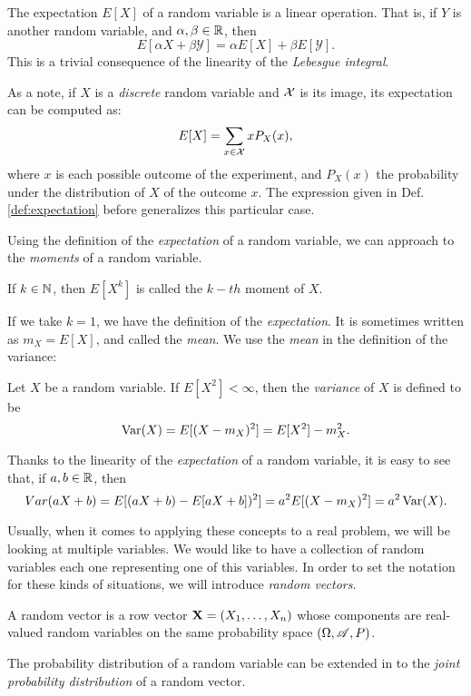 The expectation $E[X]$ of a random variable is a linear operation. That is, if $Y$ is another random variable, and $\alpha,\beta \in \mathbb{R}$, then
$$
E[\alpha X + \beta \mathcal Y] = \alpha E[X] + \beta E[\mathcal Y].
$$
This is a trivial consequence of the linearity of the \emph{Lebesgue integral}.

As a note, if $X$ is a \emph{discrete} random variable and $\mathcal{X}$ is its image, its expectation can be computed as:
$$
E[X] = \sum_{x \in \mathcal{X}} x  P_X(x),
$$
where $x$ is each possible outcome of the experiment, and $P_X(x)$ the probability under the distribution of $X$ of the outcome $x$. 
The expression given in Def. \cref{def:expectation} before generalizes this particular case.

Using the definition of the \emph{expectation} of a random variable, we can approach to the \emph{moments} of a random variable.

\begin{ndef}
If $k \in \mathbb N$, then $E[X^k]$ is called the $k-th$ moment of $X$.
\end{ndef}
If we take $k = 1$, we have the definition of the \emph{expectation}. It is sometimes written as $m_X = E[X]$, and called the \emph{mean}. We use the \emph{mean} in the definition of the variance:

\begin{ndef}
Let $X$ be a random variable. If $E[X^2] < \infty$, then the \emph{variance} of $X$ is defined to be
$$
\operatorname*{Var}(X) = E[(X - m_X)^2] = E[X^2] - m_X^2.
$$
\end{ndef}

Thanks to the linearity of the \emph{expectation} of a random variable, it is easy to see that, if $a,b \in \mathbb{R}$, then
$$
Var(aX + b) = E[(aX + b) - E[aX + b])^2] = a^2E[(X - m_X)^2] = a^2 \operatorname*{Var}(X).
$$



Usually, when it comes to applying these concepts to a real problem, we will be looking at multiple variables. We would like to have a collection of random variables each one representing one of this variables.
In order to set the notation for these kinds of situations, we will introduce \emph{random vectors}.

\begin{ndef}
  A random vector is a row vector $\mathbf{X} = (X_1,\dots,X_n)$ whose components are real-valued random variables on the same probability space $(\Omega,\mathscr{A},P)$.
\end{ndef}

The probability distribution of a random variable can be extended in to the \emph{joint probability distribution} of a random vector.

